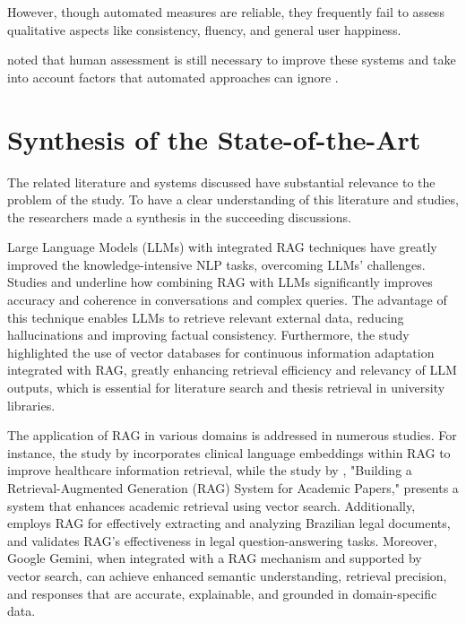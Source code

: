 \begin{refsection}
However, though automated measures are reliable, they frequently fail to assess qualitative aspects like consistency, fluency, and general user happiness.
 
\citeauthor{sivasothy2024ragprobe} \citeyear{sivasothy2024ragprobe} noted that human assessment is still necessary to improve these systems and take into account factors that automated approaches can ignore \cite{sivasothy2024ragprobe}.


\section{Synthesis of the State-of-the-Art}

The related literature and systems discussed have substantial relevance to the problem of the study. To have a clear understanding of this literature and studies, the researchers made a synthesis in the succeeding discussions.


Large Language Models (LLMs) with integrated RAG techniques have greatly improved the knowledge-intensive NLP tasks, overcoming LLMs' challenges. Studies \cite{thapa2022splitfed} and \cite{thomo2024pubmed} underline how combining RAG with LLMs significantly improves accuracy and coherence in conversations and complex queries. The advantage of this technique enables LLMs to retrieve relevant external data, reducing hallucinations and improving factual consistency. Furthermore, the study \cite{lewis2020retrieval} highlighted the use of vector databases for continuous information adaptation integrated with RAG, greatly enhancing retrieval efficiency and relevancy of LLM outputs, which is essential for literature search and thesis retrieval in university libraries.


The application of RAG in various domains is addressed in numerous studies. For instance, the study by \citeauthor{arzideh2024miracle} \citeyear{arzideh2024miracle} incorporates clinical language embeddings within RAG to improve healthcare information retrieval, while the study by \citeauthor{grigoryan2024building} \citeyear{grigoryan2024building}, "Building a Retrieval-Augmented Generation (RAG) System for Academic Papers," presents a system that enhances academic retrieval using vector search. Additionally, \citeauthor{aquino2024extracting} \citeyear{aquino2024extracting} employs RAG for effectively extracting and analyzing Brazilian legal documents, and \citeauthor{ryu2023retrieval} \citeyear{ryu2023retrieval} validates RAG’s effectiveness in legal question-answering tasks. Moreover, Google Gemini, when integrated with a RAG mechanism and supported by vector search, can achieve enhanced semantic understanding, retrieval precision, and responses that are accurate, explainable, and grounded in domain-specific data.



\end{refsection}
